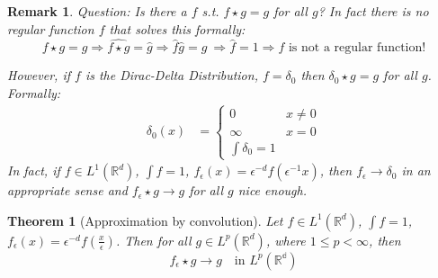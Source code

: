 \documentclass{report}
\theoremstyle{tommy}
\newtheorem{thm}[defn]{Theorem}
\newtheorem{rem}[defn]{Remark}
\begin{document}
  \begin{rem}
      Question: Is there a \(f\) s.t. \(f \star g = g\) for all \(g\)? In fact there is no regular function \(f\) that solves this formally:
      \[f \star g = g \Rightarrow \widehat{f \star g} = \hat g \Rightarrow \hat f \hat g = \hat g\ \Rightarrow \hat f = 1 \Rightarrow f \text{ is not a regular function!}\]

      However, if \(f\) is the Dirac-Delta Distribution, \(f = \delta_0\) then \(\delta_0 \star g = g\) for all \(g\). Formally:
      \begin{align*}
        \delta_0(x) &= \begin{cases}
          0 &x \ne 0 \\
          \infty &x = 0 \\
          \int \delta_0 = 1
        \end{cases}
      \end{align*}
      In fact, if \(f \in L^1(\mathbb{R}^d)\), \(\int f = 1\), \(f_\epsilon(x) = \epsilon^{-d} f(\epsilon^{-1} x)\), then \(f_\epsilon \to \delta_0\) in an appropriate sense and \(f_\epsilon \star g \to g\) for all \(g\) nice enough.
  \end{rem}
  
  \begin{thm}[Approximation by convolution]
    Let \(f \in L^1(\mathbb{R}^d)\), \(\int f = 1\), \(f_\epsilon(x) = \epsilon^{-d} f(\frac{x}{\epsilon})\). Then for all \(g \in L^p(\mathbb{R}^d)\), where \(1 \le p < \infty\), then
    \[f_\epsilon \star g \to g \quad \text{in } L^p(\mathbb{{R}^d})\]
  \end{thm}
\end{document}
